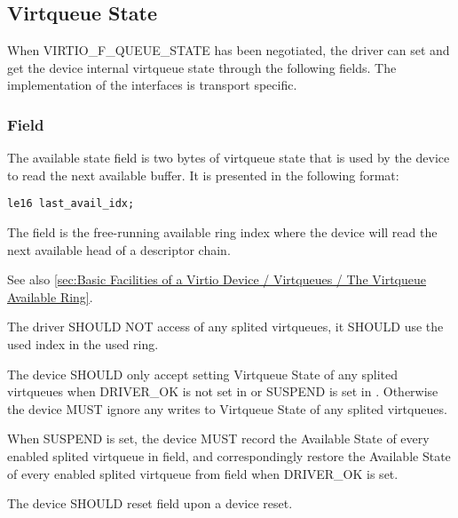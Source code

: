 \subsection{Virtqueue State}\label{sec:Basic Facilities of a Virtio Device / Splited Virtqueues / Virtqueue State}

When VIRTIO_F_QUEUE_STATE has been negotiated, the driver can set and
get the device internal virtqueue state through the following
fields. The implementation of the interfaces is transport specific.

\subsubsection{ Field}

The available state field is two bytes of virtqueue state that is used by
the device to read the next available buffer. It is presented in the following format:

\begin{lstlisting}
le16 last_avail_idx;
\end{lstlisting}

The  field is the free-running available ring
index where the device will read the next available head of a
descriptor chain.

See also \ref{sec:Basic Facilities of a Virtio Device / Virtqueues / The Virtqueue Available Ring}.


The driver SHOULD NOT access  of any splited virtqueues, it SHOULD use the
used index in the used ring.


The device SHOULD only accept setting Virtqueue State of any splited virtqueues
when DRIVER_OK is not set in  or SUSPEND is set in .
Otherwise the device MUST ignore any writes to Virtqueue State of any splited virtqueues.

When SUSPEND is set, the device MUST record the Available State of every enabled splited virtqueue
in  field,
and correspondingly restore the Available State of every enabled splited virtqueue
from  field when DRIVER_OK is set.

The device SHOULD reset  field upon a device reset.
